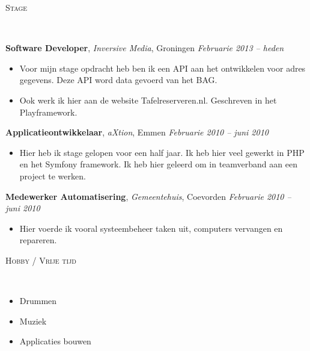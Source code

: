 \documentclass[9pt]{article}
\newenvironment{changemargin}[2]{%
  \begin{list}{}{%
    \setlength{\topsep}{0pt}%
    \setlength{\leftmargin}{#1}%
    \setlength{\rightmargin}{#2}%
    \setlength{\listparindent}{\parindent}%
    \setlength{\itemindent}{\parindent}%
    \setlength{\parsep}{\parskip}%
  }%
  \item[]}{\end{list}
}
\newcommand{\lineover}{
	\begin{changemargin}{-0.05in}{-0.05in}
		\vspace*{-8pt}
		\hrulefill \\
		\vspace*{-2pt}
	\end{changemargin}
}
\newcommand{\header}[1]{
	\begin{changemargin}{-0.5in}{-0.5in}
		\scshape{#1}\\
  	\lineover
	\end{changemargin}
}
\newenvironment{body} {
	\vspace*{-16pt}
	\begin{changemargin}{-0.25in}{-0.5in}
  }	
	{\end{changemargin}
}
\begin{document}
\header{Stage}

\begin{body}
	\vspace{14pt}
	\textbf{Software Developer}, \emph{Inversive Media}, Groningen \hfill \emph{Februarie 2013 -- heden}\\
	\vspace*{-4pt}
	\begin{itemize} \itemsep -0pt  %
		\item Voor mijn stage opdracht heb ben ik een API aan het ontwikkelen voor adres gegevens. Deze API word data gevoerd van het BAG.
		\item Ook werk ik hier aan de website Tafelreserveren.nl. Geschreven in het Playframework.
	\end{itemize}

	\textbf {Applicatieontwikkelaar}, \emph{aXtion}, Emmen \hfill \emph{Februarie 2010 -- juni 2010}\\
	\vspace*{-4pt}
	\begin{itemize} \itemsep -0pt
		\item Hier heb ik stage gelopen voor  een half jaar. Ik heb hier veel gewerkt in PHP en het Symfony framework. Ik heb hier geleerd om in teamverband aan een project te werken.
	\end{itemize}

	\textbf {Medewerker Automatisering}, \emph{Gemeentehuis}, Coevorden \hfill \emph{Februarie 2010 -- juni 2010}\\
	\vspace*{-4pt}
	\begin{itemize} \itemsep -0pt
		\item Hier voerde ik vooral systeembeheer taken uit, computers vervangen en repareren.  
	\end{itemize}
\end{body}

\smallskip


\header{Hobby / Vrije tijd}

\begin{body}
	\vspace{14pt}
	\begin{itemize} \itemsep -0pt  %
		\item Drummen
		\item Muziek
		\item Applicaties bouwen
	\end{itemize}

\end{body}

\smallskip


\smallskip
\end{document}
